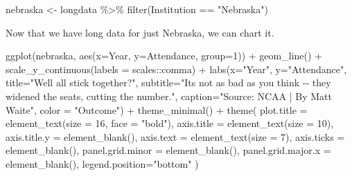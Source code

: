 \documentclass[
]{book}
\newenvironment{Shaded}{\begin{snugshade}}{\end{snugshade}}
\newcommand{\AttributeTok}[1]{\textcolor[rgb]{0.77,0.63,0.00}{#1}}
\newcommand{\DecValTok}[1]{\textcolor[rgb]{0.00,0.00,0.81}{#1}}
\newcommand{\FunctionTok}[1]{\textcolor[rgb]{0.00,0.00,0.00}{#1}}
\newcommand{\NormalTok}[1]{#1}
\newcommand{\OtherTok}[1]{\textcolor[rgb]{0.56,0.35,0.01}{#1}}
\newcommand{\SpecialCharTok}[1]{\textcolor[rgb]{0.00,0.00,0.00}{#1}}
\newcommand{\StringTok}[1]{\textcolor[rgb]{0.31,0.60,0.02}{#1}}
\begin{document}
\begin{Shaded}
\begin{Highlighting}[]
\NormalTok{nebraska }\OtherTok{\textless{}{-}}\NormalTok{ longdata }\SpecialCharTok{\%\textgreater{}\%} \FunctionTok{filter}\NormalTok{(Institution }\SpecialCharTok{==} \StringTok{"Nebraska"}\NormalTok{)}
\end{Highlighting}
\end{Shaded}

Now that we have long data for just Nebraska, we can chart it.

\begin{Shaded}
\begin{Highlighting}[]
\FunctionTok{ggplot}\NormalTok{(nebraska, }\FunctionTok{aes}\NormalTok{(}\AttributeTok{x=}\NormalTok{Year, }\AttributeTok{y=}\NormalTok{Attendance, }\AttributeTok{group=}\DecValTok{1}\NormalTok{)) }\SpecialCharTok{+} 
  \FunctionTok{geom\_line}\NormalTok{() }\SpecialCharTok{+} 
  \FunctionTok{scale\_y\_continuous}\NormalTok{(}\AttributeTok{labels =}\NormalTok{ scales}\SpecialCharTok{::}\NormalTok{comma) }\SpecialCharTok{+} 
  \FunctionTok{labs}\NormalTok{(}\AttributeTok{x=}\StringTok{"Year"}\NormalTok{, }\AttributeTok{y=}\StringTok{"Attendance"}\NormalTok{, }\AttributeTok{title=}\StringTok{"We\textquotesingle{}ll all stick together?"}\NormalTok{, }\AttributeTok{subtitle=}\StringTok{"It\textquotesingle{}s not as bad as you think {-}{-} they widened the seats, cutting the number."}\NormalTok{, }\AttributeTok{caption=}\StringTok{"Source: NCAA | By Matt Waite"}\NormalTok{, }\AttributeTok{color =} \StringTok{"Outcome"}\NormalTok{) }\SpecialCharTok{+}
  \FunctionTok{theme\_minimal}\NormalTok{() }\SpecialCharTok{+} 
  \FunctionTok{theme}\NormalTok{(}
    \AttributeTok{plot.title =} \FunctionTok{element\_text}\NormalTok{(}\AttributeTok{size =} \DecValTok{16}\NormalTok{, }\AttributeTok{face =} \StringTok{"bold"}\NormalTok{),}
    \AttributeTok{axis.title =} \FunctionTok{element\_text}\NormalTok{(}\AttributeTok{size =} \DecValTok{10}\NormalTok{),}
    \AttributeTok{axis.title.y =} \FunctionTok{element\_blank}\NormalTok{(),}
    \AttributeTok{axis.text =} \FunctionTok{element\_text}\NormalTok{(}\AttributeTok{size =} \DecValTok{7}\NormalTok{),}
    \AttributeTok{axis.ticks =} \FunctionTok{element\_blank}\NormalTok{(),}
    \AttributeTok{panel.grid.minor =} \FunctionTok{element\_blank}\NormalTok{(),}
    \AttributeTok{panel.grid.major.x =} \FunctionTok{element\_blank}\NormalTok{(),}
    \AttributeTok{legend.position=}\StringTok{"bottom"}
\NormalTok{  )}
\end{Highlighting}
\end{Shaded}
\end{document}
